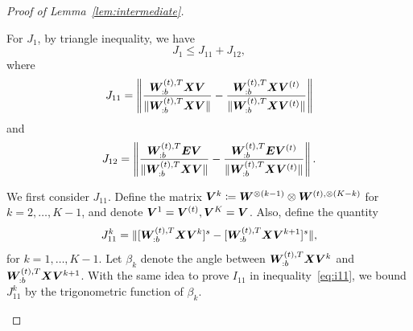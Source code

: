 \documentclass[journal]{IEEEtran}
\theoremstyle{definition}
\theoremstyle{definition}
\begin{document}
\begin{proof}[Proof of Lemma~\ref{lem:intermediate}]
\begin{enumerate}[wide]
    For $J_1$, by triangle inequality,
we have 
    \begin{equation}
        J_1 \leq J_{11} + J_{12},
    \end{equation}
    where 
    \begin{equation}
        J_{11} =  \left\lVert \frac{\bm{W}_{:b}^{(t),T} \bm X \bm{V} }{\lVert \bm{W}_{:b}^{(t),T} \bm X \bm{V} \rVert} - \frac{\bm{W}_{:b}^{(t),T} \bm X \bm{V}^{(t)} }{\lVert \bm{W}_{:b}^{(t),T} \bm X \bm{V}^{(t)} \rVert}  \right\rVert
    \end{equation}
    and
    \begin{equation}
         J_{12} =  \left\lVert \frac{\bm{W}_{:b}^{(t),T}  \bm{E} \bm{V}}{ \lVert\bm{W}_{:b}^{(t),T}  \bm X \bm{V}\rVert } - \frac{\bm{W}_{:b}^{(t),T}  \bm{E} \bm{V}^{(t)}}{ \lVert\bm{W}_{:b}^{(t),T}  \bm X \bm{V}^{(t)}\rVert }   \right\rVert.
    \end{equation}
    
    We first consider $J_{11}$.  Define the matrix $\bm{V}^{k} \coloneqq \bm{W}^{\otimes (k-1)} \otimes \bm{W}^{(t), \otimes (K-k)}$ for $k = 2,\ldots, K-1$, and denote $\bm{V}^1 = \bm{V}^{(t)}, \bm{V}^K = \bm{V}$. Also, define the quantity
    \begin{equation}
        J_{11}^k = \lVert [\bm{W}_{:b}^{(t),T} \bm X \bm{V}^k ]^s - [\bm{W}_{:b}^{(t),T} \bm X \bm{V}^{k+1} ]^s \rVert,
     \end{equation}
    for $k = 1,\ldots, K-1$. Let $\beta_k$ denote the angle between $\bm{W}_{:b}^{(t),T} \bm X \bm{V}^k$ and $\bm{W}_{:b}^{(t),T} \bm X \bm{V}^{k+1}$. With the same idea to prove $I_{11}$ in inequality~\eqref{eq:i11}, we bound $J_{11}^k$ by the trigonometric function of $\beta_k$. 
    

\end{enumerate}
\end{proof}
\end{document}
